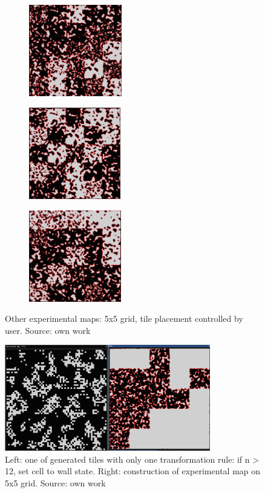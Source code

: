 \documentclass[12pt]{report}
\begin{document}
\begin{figure}[th]
	\centering
	\begin{subfigure}[t]{0.3\textwidth}
		\centering
		\includegraphics[height=4cm]{images/ex2a}
		\caption{} 
	\end{subfigure}  
	\hfill
	\begin{subfigure}[t]{0.3\textwidth}
		\centering
		\includegraphics[height=4cm]{images/ex2b}
		\caption{} 
	\end{subfigure} 
		\hfill
	\begin{subfigure}[t]{0.3\textwidth}
		\centering
		\includegraphics[height=4cm]{images/ex2c}
		\caption{} 
	\end{subfigure}
	\caption{Other experimental maps: 5x5 grid, tile placement controlled by user. Source: own work}
	\label{fig:ex2}
\end{figure}

\begin{figure}[h]
	\centering
	\includegraphics[width=0.8\textwidth]{images/r2ex1}
	\caption{Left: one of generated tiles with only one transformation rule: if n > 12, set cell to wall state. Right: construction of experimental map on 5x5 grid. Source: own work}
	\label{fig:r2ex1}
\end{figure}
\end{document}
